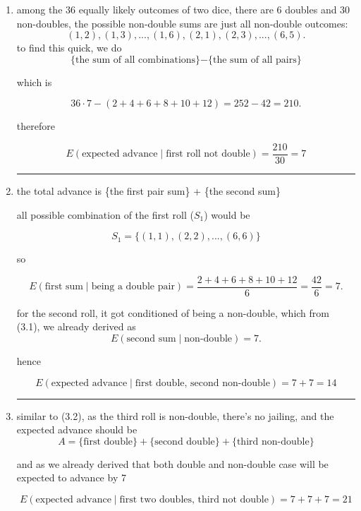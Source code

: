 \begin{enumerate}
\item 

among the $36$ equally likely outcomes of two dice, there are $6$ doubles and $30$ non-doubles, the possible non-double sums are just all non-double outcomes:
\[
    (1,2),(1,3), ..., (1, 6), (2, 1), (2, 3), ..., (6,5).
\]
to find this quick, we do 
        \[\text{\{the sum of all combinations\}} - \text{\{the sum of all pairs\}}\]

which is
        
\[
    36 \cdot 7 - (2+4+6+8+10+12) = 252-42=210.
\]

therefore

\[
    E(\text{expected advance} \mid \text{first roll not double}) = \frac{210}{30} = \boxed{7}
\]

\medskip
\begin{center}
\rule{0.3\linewidth}{0.2pt}
\end{center}
\medskip

\item the total advance is \{the first pair sum\} + \{the second sum\}

all possible combination of the first roll ($S_1$) would be

\[
    S_1 = \{(1,1), (2,2), ..., (6,6)\}
\]

so

\[
E(\text{first sum}\mid \text{being a double pair})
= \frac{2+4+6+8+10+12}{6}
= \frac{42}{6}
= 7.
\]

        for the second roll, it got conditioned of being a non-double, which from (3.1), we already derived as
\[
E(\text{second sum}\mid \text{non-double})=7.
\]

hence

\[
    E(\text{expected advance}\mid \text{first double, second non-double})
= 7+7
= \boxed{14}
\]

\medskip
\begin{center}
\rule{0.3\linewidth}{0.2pt}
\end{center}
\medskip

\item similar to (3.2), as the third roll is non-double, there's no jailing, and the expected advance should be 
\[
    A=\text{\{first double\}}+\text{\{second double\}}+\text{\{third non-double\}}
\]

and as we already derived that both double and non-double case will be expected to advance by 7

\[
    E(\text{expected advance}\mid \text{first two doubles, third not double})
= 7+7+7
= \boxed{21}
\]


\end{enumerate}
